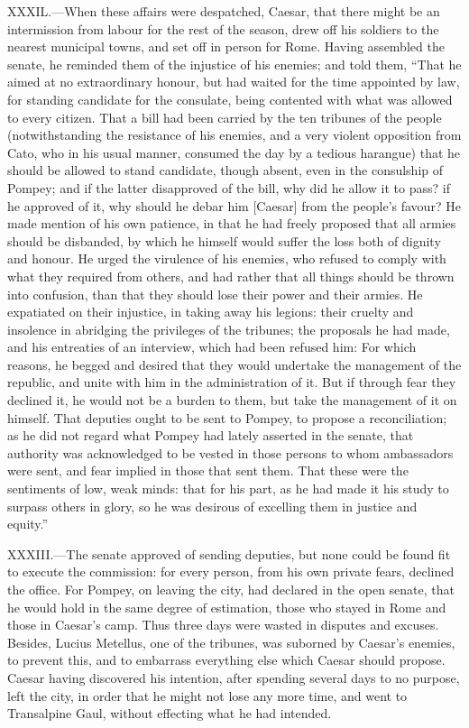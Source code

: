 XXXIL.—When these affairs were despatched, Caesar, that there might be
an intermission from labour for the rest of the season, drew off his
soldiers to the nearest municipal towns, and set off in person for Rome.
Having assembled the senate, he reminded them of the injustice of his
enemies; and told them, ``That he aimed at no extraordinary honour, but
had waited for the time appointed by law, for standing candidate for the
consulate, being contented with what was allowed to every citizen. That
a bill had been carried by the ten tribunes of the people
(notwithstanding the resistance of his enemies, and a very violent
opposition from Cato, who in his usual manner, consumed the day by a
tedious harangue) that he should be allowed to stand candidate, though
absent, even in the consulship of Pompey; and if the latter disapproved
of the bill, why did he allow it to pass? if he approved of it, why
should he debar him [Caesar] from the people's favour? He made mention
of his own patience, in that he had freely proposed that all armies
should be disbanded, by which he himself would suffer the loss both of
dignity and honour. He urged the virulence of his enemies, who refused
to comply with what they required from others, and had rather that all
things should be thrown into confusion, than that they should lose their
power and their armies. He expatiated on their injustice, in taking away
his legions: their cruelty and insolence in abridging the privileges of
the tribunes; the proposals he had made, and his entreaties of an
interview, which had been refused him: For which reasons, he begged and
desired that they would undertake the management of the republic, and
unite with him in the administration of it. But if through fear they
declined it, he would not be a burden to them, but take the management
of it on himself. That deputies ought to be sent to Pompey, to propose a
reconciliation; as he did not regard what Pompey had lately asserted in
the senate, that authority was acknowledged to be vested in those
persons to whom ambassadors were sent, and fear implied in those that
sent them. That these were the sentiments of low, weak minds: that for
his part, as he had made it his study to surpass others in glory, so he
was desirous of excelling them in justice and equity.''

XXXIII.—The senate approved of sending deputies, but none could be
found fit to execute the commission: for every person, from his own
private fears, declined the office. For Pompey, on leaving the city, had
declared in the open senate, that he would hold in the same degree of
estimation, those who stayed in Rome and those in Caesar's camp. Thus
three days were wasted in disputes and excuses. Besides, Lucius
Metellus, one of the tribunes, was suborned by Caesar's enemies, to
prevent this, and to embarrass everything else which Caesar should
propose. Caesar having discovered his intention, after spending several
days to no purpose, left the city, in order that he might not lose any
more time, and went to Transalpine Gaul, without effecting what he had
intended.

